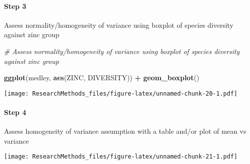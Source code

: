 \documentclass[]{book}
\newenvironment{Shaded}{\begin{snugshade}}{\end{snugshade}}
\newcommand{\KeywordTok}[1]{\textcolor[rgb]{0.13,0.29,0.53}{\textbf{#1}}}
\newcommand{\DataTypeTok}[1]{\textcolor[rgb]{0.13,0.29,0.53}{#1}}
\newcommand{\StringTok}[1]{\textcolor[rgb]{0.31,0.60,0.02}{#1}}
\newcommand{\CommentTok}[1]{\textcolor[rgb]{0.56,0.35,0.01}{\textit{#1}}}
\newcommand{\OperatorTok}[1]{\textcolor[rgb]{0.81,0.36,0.00}{\textbf{#1}}}
\newcommand{\NormalTok}[1]{#1}
\let\oldparagraph\paragraph
\renewcommand{\paragraph}[1]{\oldparagraph{#1}\mbox{}}
\begin{document}
\paragraph{Step 3}\label{step-3}

Assess normality/homogeneity of variance using boxplot of species
diversity against zinc group

\begin{Shaded}
\begin{Highlighting}[]

\CommentTok{# Assess normality/homogeneity of variance using boxplot of species diversity against zinc group}

\KeywordTok{ggplot}\NormalTok{(medley, }\KeywordTok{aes}\NormalTok{(ZINC, DIVERSITY)) }\OperatorTok{+}
\StringTok{  }\KeywordTok{geom_boxplot}\NormalTok{()}
\end{Highlighting}
\end{Shaded}

\texttt{[image: ResearchMethods\_files/figure-latex/unnamed-chunk-20-1.pdf]}

\paragraph{Step 4}\label{step-4}

Assess homogeneity of variance assumption with a table and/or plot of
mean vs variance

\begin{Shaded}
\end{Shaded}

\texttt{[image: ResearchMethods\_files/figure-latex/unnamed-chunk-21-1.pdf]}
\end{document}
